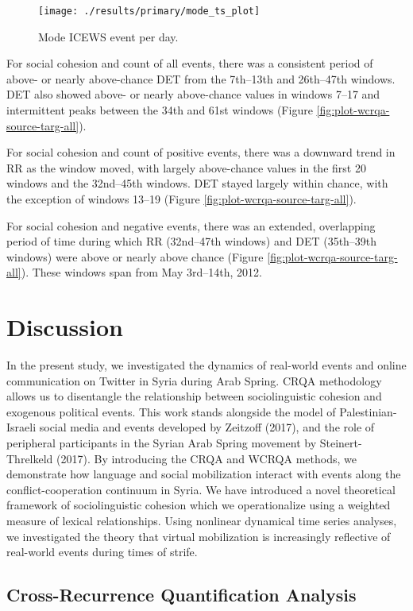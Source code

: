 \documentclass[english,man]{apa6}
\begin{document}
\begin{figure}
\texttt{[image: ./results/primary/mode\_ts\_plot]} \caption{Mode ICEWS event per day.}\label{fig:plot-mode-event}
\end{figure}

For social cohesion and count of all events, there was a consistent period of
above- or nearly above-chance DET from the 7th--13th and 26th--47th windows. DET
also showed above- or nearly above-chance values in windows 7--17 and
intermittent peaks between the 34th and 61st windows (Figure
\ref{fig:plot-wcrqa-source-targ-all}).

For social cohesion and count of positive events, there was a downward trend in
RR as the window moved, with largely above-chance values in the first 20 windows
and the 32nd--45th windows. DET stayed largely within chance, with the exception
of windows 13--19 (Figure \ref{fig:plot-wcrqa-source-targ-all}).

For social cohesion and negative events, there was an extended, overlapping
period of time during which RR (32nd--47th windows) and DET (35th--39th windows)
were above or nearly above chance (Figure
\ref{fig:plot-wcrqa-source-targ-all}). These windows span from May 3rd--14th,
2012.

\hypertarget{discussion}{%
\section{Discussion}\label{discussion}}

In the present study, we investigated the dynamics of real-world events and
online communication on Twitter in Syria during Arab Spring. CRQA methodology
allows us to disentangle the relationship between sociolinguistic cohesion and
exogenous political events. This work stands alongside the model of
Palestinian-Israeli social media and events developed by Zeitzoff (2017), and
the role of peripheral participants in the Syrian Arab Spring movement by
Steinert-Threlkeld (2017). By introducing the CRQA and WCRQA methods, we
demonstrate how language and social mobilization interact with events along the
conflict-cooperation continuum in Syria. We have introduced a novel theoretical
framework of sociolinguistic cohesion which we operationalize using a weighted
measure of lexical relationships. Using nonlinear dynamical time series
analyses, we investigated the theory that virtual mobilization is increasingly
reflective of real-world events during times of strife.

\hypertarget{cross-recurrence-quantification-analysis-2}{%
\subsection{Cross-Recurrence Quantification Analysis}\label{cross-recurrence-quantification-analysis-2}}
\end{document}
